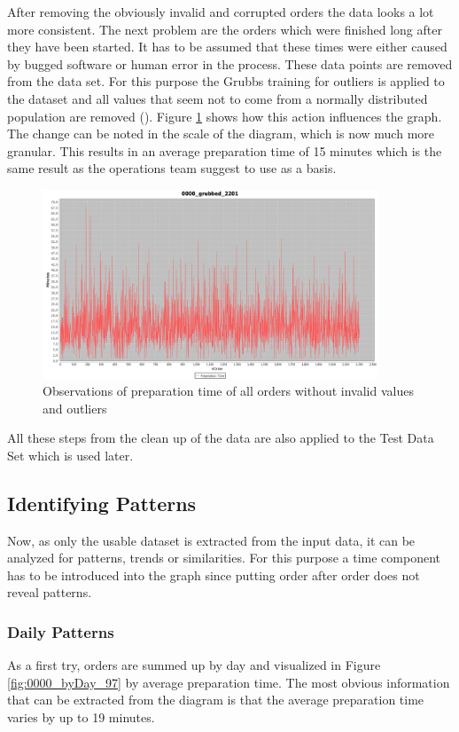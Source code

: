 \newpage After removing the obviously invalid and corrupted orders the data looks a lot more consistent. The next problem are the orders which were finished long after they have been started. It has to be assumed that these times were either caused by bugged software or human error in the process. These data points are removed from the data set. For this purpose the Grubbs training for outliers is applied to the dataset and all values that seem not to come from a normally distributed population are removed (\cite{Grubbs}). Figure \ref{fig:0000_grubbed_2201} shows how this action influences the graph. The change can be noted in the scale of the diagram, which is now much more granular. This results in an average preparation time of 15 minutes which is the same result as the operations team suggest to use as a basis.

\begin{figure}[h]
\begin{center}
\includegraphics[width=10cm]{images/0000_grubbed_2201.png}
\caption{Observations of preparation time of all orders without invalid values and outliers}
\label{fig:0000_grubbed_2201}
\end{center}
\end{figure}

All these steps from the clean up of the data are also applied to the Test Data Set which is used later.

\subsection{Identifying Patterns}
Now, as only the usable dataset is extracted from the input data, it can be analyzed for patterns, trends or similarities. For this purpose a time component has to be introduced into the graph since putting order after order does not reveal patterns.
\subsubsection{Daily Patterns}
As a first try, orders are summed up by day and visualized in Figure \ref{fig:0000_byDay_97}  by average preparation time. The most obvious information that can be extracted from the diagram is that the average preparation time varies by up to 19 minutes.

